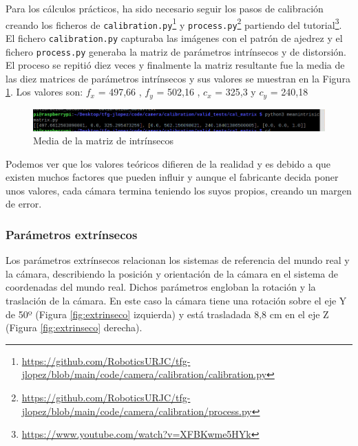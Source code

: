 Para los cálculos prácticos, ha sido necesario seguir los pasos de calibración creando los ficheros de \verb|calibration.py|\footnote{\url{https://github.com/RoboticsURJC/tfg-jlopez/blob/main/code/camera/calibration/calibration.py}} y \verb|process.py|\footnote{\url{https://github.com/RoboticsURJC/tfg-jlopez/blob/main/code/camera/calibration/process.py}} partiendo del tutorial\footnote{\url{https://www.youtube.com/watch?v=XFBKwme5HYk}}. El fichero \verb|calibration.py| capturaba las imágenes con el patrón de ajedrez y el fichero \verb|process.py| generaba la matriz de parámetros intrínsecos y de distorsión. El proceso se repitió diez veces y finalmente la matriz resultante fue la media de las diez matrices de parámetros intrínsecos y sus valores se muestran en la Figura \ref{fig:meanintrinseco}. Los valores son: $f_x$ = 497,66 , $f_y$ = 502,16 , $c_x$ = 325,3 y $c_y$ = 240,18

 \begin{figure} [h!]
	\begin{center}
		\includegraphics[width=15cm]{figs/cap6/intrinsicmedia.png}
	\end{center}
	\caption{Media de la matriz de intrínsecos}
	\label{fig:meanintrinseco}
\end{figure}


Podemos ver que los valores teóricos difieren de la realidad y es debido a que existen muchos factores que pueden influir y aunque el fabricante decida poner unos valores, cada cámara termina teniendo los suyos propios, creando un margen de error.


\subsubsection{Parámetros extrínsecos}
\label{subsubsec:extrinsecoscamara}

Los parámetros extrínsecos relacionan los sistemas de referencia del mundo real y la cámara, describiendo la posición y orientación de la cámara en el sistema de coordenadas del mundo real. Dichos parámetros engloban la rotación y la traslación de la cámara. En este caso la cámara tiene una rotación sobre el eje Y de 50º (Figura \ref{fig:extrinseco} izquierda) y está trasladada 8,8 cm en el eje Z (Figura \ref{fig:extrinseco} derecha). 

